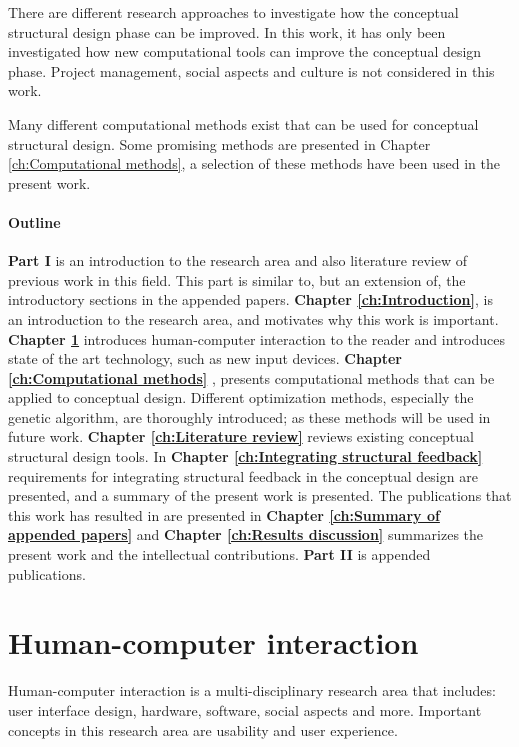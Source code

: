 There are different research approaches to investigate how the conceptual structural design phase can be improved. In this work, it has only been investigated how new computational tools can improve the conceptual design phase. Project management, social aspects and culture is not considered in this work.

Many different computational methods exist that can be used for conceptual structural design. Some promising methods are presented in Chapter \ref{ch:Computational methods}, a selection of these methods have been used in the present work.

\subsubsection{Outline}
\textbf{Part I} is an introduction to the research area and also literature review of previous work in this field. This part is similar to, but an extension of, the introductory sections in the appended papers. \textbf{Chapter \ref{ch:Introduction}}, is an introduction to the research area, and motivates why this work is important. \textbf{Chapter \ref{ch:Human-computer interaction}} introduces human-computer interaction to the reader and introduces state of the art technology, such as new input devices. \textbf{Chapter \ref{ch:Computational methods}} , presents computational methods that can be applied to conceptual design. Different optimization methods, especially the genetic algorithm, are thoroughly introduced; as these methods will be used in future work. \textbf{Chapter \ref{ch:Literature review}} reviews existing conceptual structural design tools. In \textbf{Chapter \ref{ch:Integrating structural feedback}} requirements for integrating structural feedback in the conceptual design are presented, and a summary of the present work is presented. The publications that this work has resulted in are presented in \textbf{Chapter \ref{ch:Summary of appended papers}} and \textbf{Chapter \ref{ch:Results discussion}} summarizes the present work and the intellectual contributions. \textbf{Part II}  is appended publications.






\chapter{Human-computer interaction}
\label{ch:Human-computer interaction}
Human-computer interaction is a multi-disciplinary research area that includes: user interface design, hardware, software, social aspects and more. Important concepts in this research area are usability and user experience.

